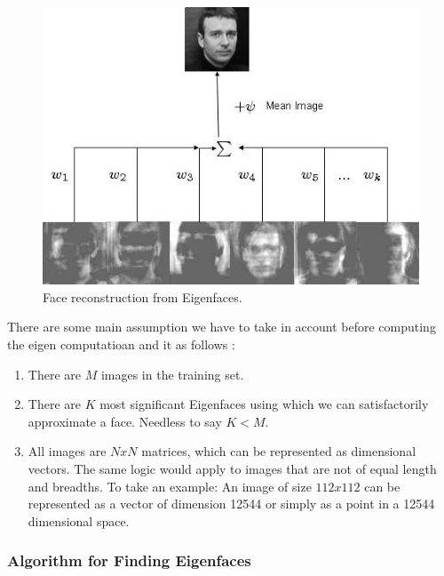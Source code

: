 \documentclass[a4paper,twoside]{article}
\begin{document}
\begin{figure}[h]
 \begin{center}
 \centering
\includegraphics[scale=0.3]{eigenfacesrec.jpg} \caption{Face reconstruction from Eigenfaces. }
 \end{center}\end{figure}

There are some main assumption we have to take in account before computing the eigen computatioan and it as follows :%
\begin{enumerate}

\item There are $M$ images in the training set.

\item There are $K$ most significant Eigenfaces using which we can satisfactorily approximate a face. Needless to say $K <M$.

\item All images are $NxN$ matrices, which can be represented as dimensional vectors. The same logic would apply to images that are not of equal length and breadths. To take an example: An image of size $112 x 112$ can be represented as a vector of dimension 12544 or simply as a point in a 12544 dimensional space.
\end{enumerate}
\subsubsection{Algorithm for Finding Eigenfaces}
\end{document}
